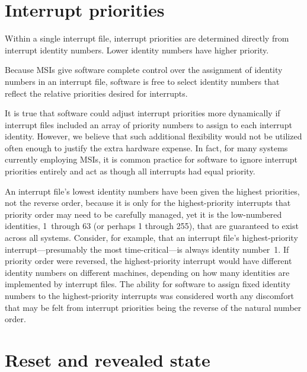 \section{Interrupt priorities}

Within a single interrupt file, interrupt priorities are determined
directly from interrupt identity numbers.
Lower identity numbers have higher priority.

\begin{commentary}
Because MSIs give software complete control over the assignment of
identity numbers in an interrupt file, software is free to select
identity numbers that reflect the relative priorities desired for
interrupts.

It is true that software could adjust interrupt priorities more
dynamically if interrupt files included an array of priority numbers to
assign to each interrupt identity.
However, we believe that such additional flexibility would not be
utilized often enough to justify the extra hardware expense.
In fact, for many systems currently employing MSIs, it is common
practice for software to ignore interrupt priorities entirely and act
as though all interrupts had equal priority.
\end{commentary}

\begin{commentary}
An interrupt file's lowest identity numbers have been given the
highest priorities, not the reverse order, because it is only for
the highest-priority interrupts that priority order may need to be
carefully managed, yet it is the low-numbered identities, 1~through 63
(or perhaps 1 through 255), that are guaranteed to exist across all
systems.
Consider, for example, that an interrupt file's highest-priority
interrupt---presumably the most time-critical---is always identity
number~1.
If priority order were reversed, the highest-priority interrupt would
have different identity numbers on different machines, depending on how
many identities are implemented by interrupt files.
The ability for software to assign fixed identity numbers to the
highest-priority interrupts was considered worth any discomfort that
may be felt from interrupt priorities being the reverse of the natural
number order.
\end{commentary}

\section{Reset and revealed state}

